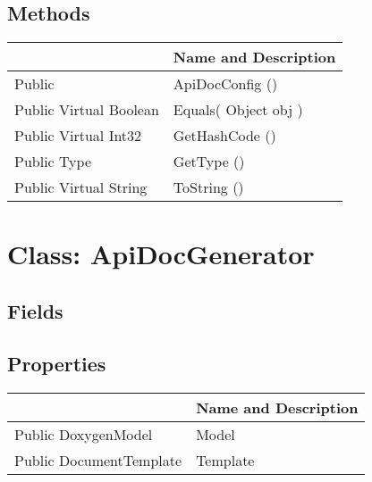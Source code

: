 \documentclass[11pt, oneside, a4paper]{book}
\begin{document}
\subsection{Methods}
\begin{center}
\begin{tabular}{| p{3cm} | p{12cm} | }
\hline
\textbf{ } & \textbf{ Name and Description}\\
\hline
 Public  &  ApiDocConfig ()\hypertarget{SoftwareEngineeringTools.{}Documentation.{}ApiDocConfig.{}ApiDocConfig}{}\\
\hline
 Public  Virtual  Boolean &  Equals(\hypertarget{SoftwareEngineeringTools.{}Documentation.{}ApiDocConfig.{}Equals\_Object}{} Object  obj  )\\
\hline
 Public  Virtual  Int32 &  GetHashCode ()\hypertarget{SoftwareEngineeringTools.{}Documentation.{}ApiDocConfig.{}GetHashCode}{}\\
\hline
 Public  Type &  GetType ()\hypertarget{SoftwareEngineeringTools.{}Documentation.{}ApiDocConfig.{}GetType}{}\\
\hline
 Public  Virtual  String &  ToString ()\hypertarget{SoftwareEngineeringTools.{}Documentation.{}ApiDocConfig.{}ToString}{}\\
\hline
\end{tabular}
\end{center}
 


\hypertarget{SoftwareEngineeringTools.{}Documentation.{}ApiDocGenerator}{}
\section{Class: ApiDocGenerator}

\subsection{Fields}

\subsection{Properties}
\begin{center}
\begin{tabular}{| p{3cm} | p{12cm} | }
\hline
\textbf{ } & \textbf{ Name and Description}\\
\hline
 Public  DoxygenModel &  Model\hypertarget{SoftwareEngineeringTools.{}Documentation.{}ApiDocGenerator.{}Model}{}\\
\hline
 Public  DocumentTemplate &  Template\hypertarget{SoftwareEngineeringTools.{}Documentation.{}ApiDocGenerator.{}Template}{}\\
\hline
\end{tabular}
\end{center}
\end{document}

